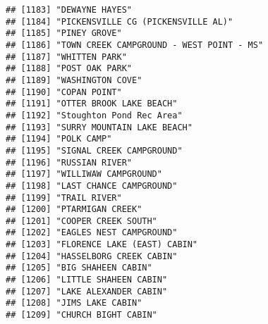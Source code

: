 \documentclass[
]{article}
\begin{document}
\begin{verbatim}
## [1183] "DEWAYNE HAYES"                                                                       
## [1184] "PICKENSVILLE CG (PICKENSVILLE AL)"                                                   
## [1185] "PINEY GROVE"                                                                         
## [1186] "TOWN CREEK CAMPGROUND - WEST POINT - MS"                                             
## [1187] "WHITTEN PARK"                                                                        
## [1188] "POST OAK PARK"                                                                       
## [1189] "WASHINGTON COVE"                                                                     
## [1190] "COPAN POINT"                                                                         
## [1191] "OTTER BROOK LAKE BEACH"                                                              
## [1192] "Stoughton Pond Rec Area"                                                             
## [1193] "SURRY MOUNTAIN LAKE BEACH"                                                           
## [1194] "POLK CAMP"                                                                           
## [1195] "SIGNAL CREEK CAMPGROUND"                                                             
## [1196] "RUSSIAN RIVER"                                                                       
## [1197] "WILLIWAW CAMPGROUND"                                                                 
## [1198] "LAST CHANCE CAMPGROUND"                                                              
## [1199] "TRAIL RIVER"                                                                         
## [1200] "PTARMIGAN CREEK"                                                                     
## [1201] "COOPER CREEK SOUTH"                                                                  
## [1202] "EAGLES NEST CAMPGROUND"                                                              
## [1203] "FLORENCE LAKE (EAST) CABIN"                                                          
## [1204] "HASSELBORG CREEK CABIN"                                                              
## [1205] "BIG SHAHEEN CABIN"                                                                   
## [1206] "LITTLE SHAHEEN CABIN"                                                                
## [1207] "LAKE ALEXANDER CABIN"                                                                
## [1208] "JIMS LAKE CABIN"                                                                     
## [1209] "CHURCH BIGHT CABIN"                                                                  

\end{verbatim}
\end{document}
